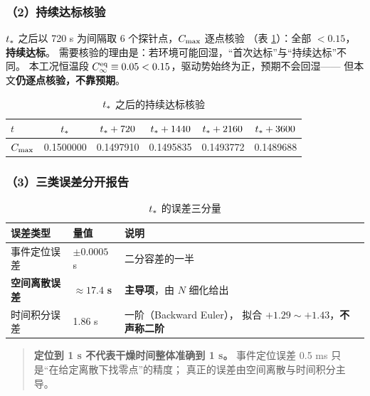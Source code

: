 \subsubsection*{（2）持续达标核验}

$t_{*}$ 之后以 720 s 为间隔取 6 个探针点，$C_{\max}$ 逐点核验
（表 \ref{tab:sustain}）：全部 $<0.15$，\textbf{持续达标}。
需要核验的理由是：若环境可能回湿，``首次达标''与``持续达标''不同。
本工况恒温段 $C_\infty^{\mathrm{eq}}\equiv0.05<0.15$，驱动势始终为正，预期不会回湿——
但本文\textbf{仍逐点核验，不靠预期}。

\begin{table}[H]
  \centering
  \caption{$t_{*}$ 之后的持续达标核验}
  \label{tab:sustain}
  \footnotesize
  \begin{tabular}{@{}lccccc@{}}
    \toprule
    $t$ & $t_{*}$ & $t_{*}+720$ & $t_{*}+1440$ & $t_{*}+2160$ & $t_{*}+3600$ \\
    \midrule
    $C_{\max}$ & 0.1500000 & 0.1497910 & 0.1495835 & 0.1493772 & 0.1489688 \\
    \bottomrule
  \end{tabular}
\end{table}

\subsubsection*{（3）三类误差分开报告}

\begin{table}[H]
  \centering
  \caption{$t_{*}$ 的误差三分量}
  \label{tab:err3}
  \footnotesize
  \begin{tabular}{@{}lll@{}}
    \toprule
    误差类型 & 量值 & 说明 \\
    \midrule
    事件定位误差 & $\pm0.0005$ s & 二分容差的一半 \\
    \textbf{空间离散误差} & $\approx\mathbf{17.4}$ \textbf{s} & \textbf{主导项}，由 $N$ 细化给出 \\
    时间积分误差 & 1.86 s & 一阶（Backward Euler），
                               拟合 $+1.29\sim+1.43$，\textbf{不声称二阶} \\
    \bottomrule
  \end{tabular}
\end{table}

\begin{quote}
  \textbf{定位到 1 s 不代表干燥时间整体准确到 1 s。}
  事件定位误差 0.5 ms 只是``在给定离散下找零点''的精度；
  真正的误差由空间离散与时间积分主导。
\end{quote}

